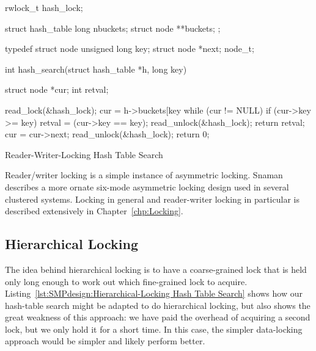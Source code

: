 \begin{listing}
\begin{VerbatimL}[commandchars=\\\[\]]
rwlock_t hash_lock;

struct hash_table
{
	long nbuckets;
	struct node **buckets;
};

typedef struct node {
	unsigned long key;
	struct node *next;
} node_t;

int hash_search(struct hash_table *h, long key)
{
	struct node *cur;
	int retval;

	read_lock(&hash_lock);
	cur = h->buckets[key %
	while (cur != NULL) {
		if (cur->key >= key) {
			retval = (cur->key == key);
			read_unlock(&hash_lock);
			return retval;
		}
		cur = cur->next;
	}
	read_unlock(&hash_lock);
	return 0;
}
\end{VerbatimL}
\caption{Reader-Writer-Locking Hash Table Search}
\label{lst:SMPdesign:Reader-Writer-Locking Hash Table Search}
\end{listing}

Reader/writer locking is a simple instance of asymmetric locking.
Snaman~\cite{Snaman87} describes a more ornate six-mode
asymmetric locking design used in several clustered systems.
Locking in general and reader-writer locking in particular is described
extensively in
Chapter~\ref{chp:Locking}.

\subsection{Hierarchical Locking}
\label{sec:SMPdesign:Hierarchical Locking}

The idea behind hierarchical locking is to have a coarse-grained lock
that is held only long enough to work out which fine-grained lock
to acquire.
Listing~\ref{lst:SMPdesign:Hierarchical-Locking Hash Table Search}
shows how our hash-table search might be adapted to do hierarchical
locking, but also shows the great weakness of this approach:
we have paid the overhead of acquiring a second lock, but we only
hold it for a short time.
In this case, the simpler data-locking approach would be simpler
and likely perform better.

